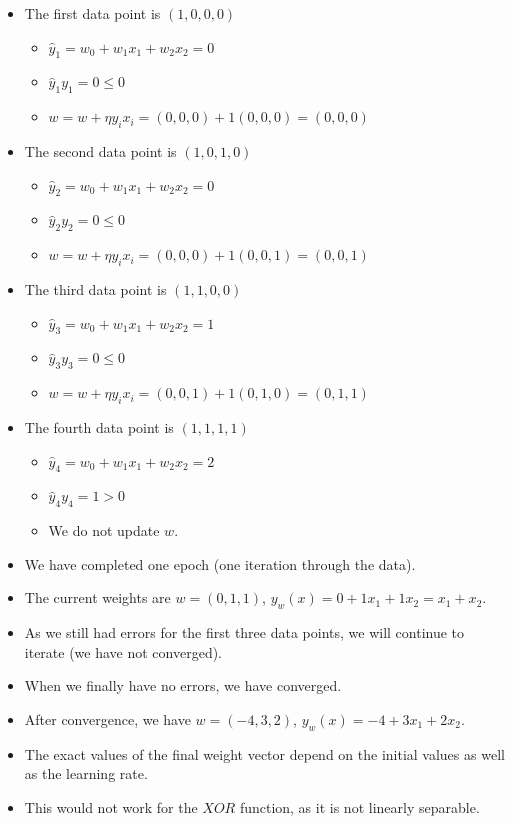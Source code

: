 \documentclass[12pt]{article}
\begin{document}
\begin{itemize}
                \item The first data point is $(1, 0, 0, 0)$
                \begin{itemize}
                    \item $\hat{y}_1 = w_0 + w_1{x_1} + w_2{x_2} = 0$
                    \item $\hat{y}_1{y_1} = 0 \le 0$
                    \item $w = w + \eta{y_i}{x_i} = (0, 0, 0) + 1(0, 0, 0) = (0, 0, 0)$
                \end{itemize}
                \item The second data point is $(1, 0, 1, 0)$
                \begin{itemize}
                    \item $\hat{y}_2 = w_0 + w_1{x_1} + w_2{x_2} = 0$
                    \item $\hat{y}_2{y_2} = 0 \le 0$
                    \item $w = w + \eta{y_i}{x_i} = (0, 0, 0) + 1(0, 0, 1) = (0, 0, 1)$
                \end{itemize}
                \item The third data point is $(1, 1, 0, 0)$
                \begin{itemize}
                    \item $\hat{y}_3 = w_0 + w_1{x_1} + w_2{x_2} = 1$
                    \item $\hat{y}_3{y_3} = 0 \le 0$
                    \item $w = w + \eta{y_i}{x_i} = (0, 0, 1) + 1(0, 1, 0) = (0, 1, 1)$
                \end{itemize}
                \item The fourth data point is $(1, 1, 1, 1)$
                \begin{itemize}
                    \item $\hat{y}_4 = w_0 + w_1{x_1} + w_2{x_2} = 2$
                    \item $\hat{y}_4{y_4} = 1 > 0$
                    \item We do not update $w$.
                \end{itemize}
                \item We have completed one epoch (one iteration through the data).
                \item The current weights are $w = (0, 1, 1)$, $y_w(x) = 0 + 1{x_1} + 1{x_2} = x_1 + x_2$.
                \item As we still had errors for the first three data points, we will continue to iterate (we have not converged).
                \item When we finally have no errors, we have converged.
                \item After convergence, we have $w = (-4, 3, 2)$, $y_w(x) = -4 + 3{x_1} + 2{x_2}$.
                \item The exact values of the final weight vector depend on the initial values as well as the learning rate.
                \item This would not work for the $XOR$ function, as it is not linearly separable.
            \end{itemize}
\end{document}
